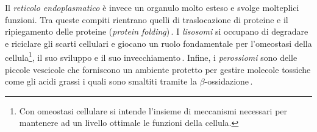 Il \textsl{reticolo endoplasmatico} è invece un organulo molto esteso e svolge molteplici funzioni. Tra queste compiti rientrano quelli di traslocazione di proteine e il ripiegamento delle proteine (\textsl{protein folding})\,\cite{alberts2015essential, voeltz2002structural}. I \textsl{lisosomi} si occupano di degradare e riciclare gli scarti cellulari e giocano un ruolo fondamentale per l'omeostasi della cellula\footnote{Con omeostasi cellulare si intende l'insieme di meccanismi necessari per mantenere ad un livello ottimale le funzioni della cellula.}, il suo sviluppo e il suo invecchiamento\,\cite{ballabio2016awesome, yang2021lysosome, dell2000lysosome}. Infine, i \textsl{perossiomi} sono delle piccole vescicole che forniscono un ambiente protetto per gestire molecole tossiche come gli acidi grassi i quali sono smaltiti tramite la $\beta$-ossidazione\,\cite{alberts2015essential, islinger2012peroxisome, islinger2018peroxisome}.

